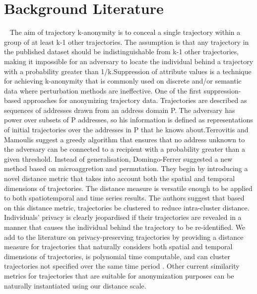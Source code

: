 \section{Background Literature}~\label{sec:literature}
The aim of trajectory k-anonymity is to conceal a single trajectory within a group of at least k-1 other trajectories. The assumption is that any trajectory in the published dataset should be indistinguishable from k-1 other trajectories, making it impossible for an adversary to locate the individual behind a trajectory with a probability greater than 1/k.Suppression of attribute values is a technique for achieving k-anonymity that is commonly used on discrete and/or semantic data where perturbation methods are ineffective. One of the first suppression-based approaches for anonymizing trajectory data. Trajectories are described as sequences of addresses drawn from an address domain P. The adversary has power over subsets of P addresses, so his information is defined as representations of initial trajectories over the addresses in P that he knows about.Terrovitis and Mamoulis\cite{terrovitis2008privacy} suggest a greedy algorithm that ensures that no address unknown to the adversary can be connected to a recipient with a probability greater than a given threshold. Instead of generalisation, Domingo-Ferrer suggested a new method based on microaggretion and permutation. They begin by introducing a novel distance metric that takes into account both the spatial and temporal dimensions of trajectories. The distance measure is versatile enough to be applied to both spatiotemporal and time series results. The authors suggest that based on this distance metric, trajectories be clustered to reduce intra-cluster distance. Individuals' privacy is clearly jeopardised if their trajectories are revealed in a manner that causes the individual behind the trajectory to be re-identified. We add to the literature on privacy-preserving trajectories by providing a distance measure for trajectories that naturally considers both spatial and temporal dimensions of trajectories, is polynomial time computable, and can cluster trajectories not specified over the same time period \cite{domingo2012microaggregation}. Other current similarity metrics for trajectories that are suitable for anonymization purposes can be naturally instantiated using our distance scale.